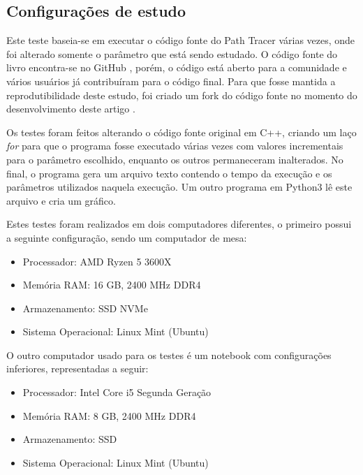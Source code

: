 \documentclass[journal]{IEEEtran}
\begin{document}
\subsection{Configurações de estudo}
Este teste baseia-se em executar o código fonte do Path Tracer várias vezes, onde foi alterado somente o 
parâmetro que está sendo estudado. O código fonte do livro encontra-se no GitHub \cite{RayTracinOneWeekend-GitHub},
porém, o código está aberto para a comunidade e vários usuários já contribuíram para o código final. Para
que fosse mantida a reprodutibilidade deste estudo, foi criado um fork do código fonte no momento do
desenvolvimento deste artigo \cite{RayTracinOneWeekend-Artigo}.

Os testes foram feitos alterando o código fonte original em C++, criando um laço \emph{for} para que o programa
fosse executado várias vezes com valores incrementais para o parâmetro escolhido, enquanto os outros
permaneceram inalterados. No final, o programa gera um arquivo texto contendo o tempo da execução e os
parâmetros utilizados naquela execução. Um outro programa em Python3 lê este arquivo e cria um gráfico.

Estes testes foram realizados em dois computadores diferentes, o primeiro possui a seguinte configuração, sendo
um computador de mesa:

\begin{itemize}
  \item Processador: AMD Ryzen 5 3600X
  \item Memória RAM: 16 GB, 2400 MHz DDR4
  \item Armazenamento: SSD NVMe
  \item Sistema Operacional: Linux Mint (Ubuntu)
\end{itemize}

O outro computador usado para os testes é um notebook com configurações inferiores, representadas a seguir:

\begin{itemize}
  \item Processador: Intel Core i5 Segunda Geração
  \item Memória RAM: 8 GB, 2400 MHz DDR4
  \item Armazenamento: SSD 
  \item Sistema Operacional: Linux Mint (Ubuntu)
\end{itemize}

\end{document}
